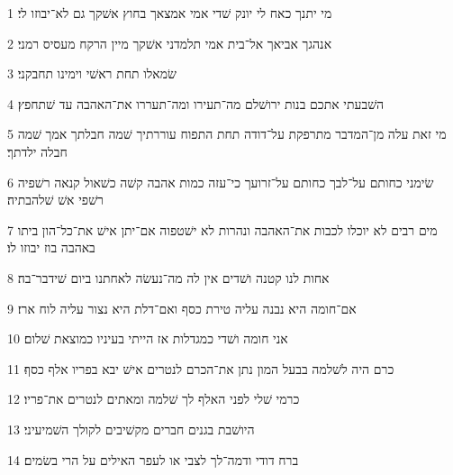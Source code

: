 \par 1 מי יתנך כאח לי יונק שׁדי אמי אמצאך בחוץ אשׁקך גם לא־יבוזו לי׃
\par 2 אנהגך אביאך אל־בית אמי תלמדני אשׁקך מיין הרקח מעסיס רמני׃
\par 3 שׂמאלו תחת ראשׁי וימינו תחבקני׃
\par 4 השׁבעתי אתכם בנות ירושׁלם מה־תעירו ומה־תעררו את־האהבה עד שׁתחפץ׃
\par 5 מי זאת עלה מן־המדבר מתרפקת על־דודה תחת התפוח עוררתיך שׁמה חבלתך אמך שׁמה חבלה ילדתך׃
\par 6 שׂימני כחותם על־לבך כחותם על־זרועך כי־עזה כמות אהבה קשׁה כשׁאול קנאה רשׁפיה רשׁפי אשׁ שׁלהבתיה׃
\par 7 מים רבים לא יוכלו לכבות את־האהבה ונהרות לא ישׁטפוה אם־יתן אישׁ את־כל־הון ביתו באהבה בוז יבוזו לו׃
\par 8 אחות לנו קטנה ושׁדים אין לה מה־נעשׂה לאחתנו ביום שׁידבר־בה׃
\par 9 אם־חומה היא נבנה עליה טירת כסף ואם־דלת היא נצור עליה לוח ארז׃
\par 10 אני חומה ושׁדי כמגדלות אז הייתי בעיניו כמוצאת שׁלום׃
\par 11 כרם היה לשׁלמה בבעל המון נתן את־הכרם לנטרים אישׁ יבא בפריו אלף כסף׃
\par 12 כרמי שׁלי לפני האלף לך שׁלמה ומאתים לנטרים את־פריו׃
\par 13 היושׁבת בגנים חברים מקשׁיבים לקולך השׁמיעיני׃
\par 14 ברח דודי ודמה־לך לצבי או לעפר האילים על הרי בשׂמים׃


